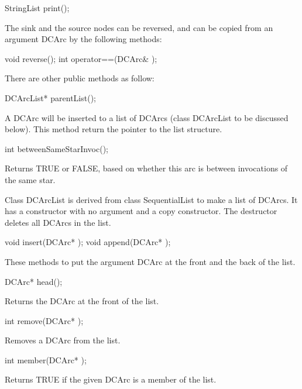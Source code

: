\begin{example}
StringList print();
\end{example}

The sink and the source nodes can be reversed, and can be copied from
an argument DCArc by the following methods:

\begin{example}
void reverse();
int operator==(DCArc& );
\end{example}

There are other public methods as follow:

\begin{example}
DCArcList* parentList();
\end{example}

A DCArc will be inserted to a list of DCArcs (class DCArcList to be discussed
below). This method return the pointer to the list structure.

\begin{example}
int betweenSameStarInvoc();
\end{example}

Returns TRUE or FALSE, based on whether this arc is between invocations of
the same star.

Class DCArcList is derived from class SequentialList to make a list of
DCArcs. It has a constructor with no argument and a copy constructor.
The destructor deletes all DCArcs in the list.

\begin{example}
void insert(DCArc* );
void append(DCArc* );
\end{example}

These methods to put the argument DCArc at the front and the back of the list.

\begin{example}
DCArc* head();
\end{example}

Returns the DCArc at the front of the list.

\begin{example}
int remove(DCArc* );
\end{example}

Removes a DCArc from the list.

\begin{example}
int member(DCArc* );
\end{example}

Returns TRUE if the given DCArc is a member of the list.

